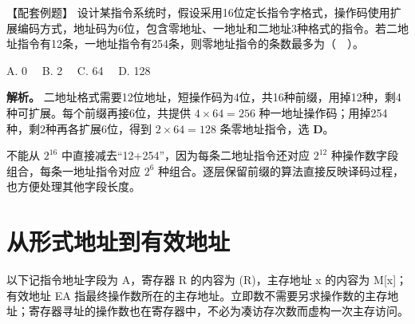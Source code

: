 \begin{example}[配套例题]

【配套例题】 设计某指令系统时，假设采用16位定长指令字格式，操作码使用扩展编码方式，地址码为6位，包含零地址、一地址和二地址3种格式的指令。若二地址指令有12条，一地址指令有254条，则零地址指令的条数最多为（　）。

A. 0　 B. 2　 C. 64　 D. 128

\end{example}

\textbf{解析。} 二地址格式需要12位地址，短操作码为4位，共16种前缀，用掉12种，剩4种可扩展。每个前缀再接6位，共提供 \(4\times64=256\) 种一地址操作码；用掉254种，剩2种再各扩展6位，得到 \(2\times64=128\) 条零地址指令，选 \textbf{D}。

不能从 \(2^{16}\) 中直接减去``12+254''，因为每条二地址指令还对应 \(2^{12}\) 种操作数字段组合，每条一地址指令对应 \(2^6\) 种组合。逐层保留前缀的算法直接反映译码过程，也方便处理其他字段长度。

\section{从形式地址到有效地址}\label{CO04-04}

以下记指令地址字段为 A，寄存器 R 的内容为 (R)，主存地址 x 的内容为 M{[}x{]}；有效地址 EA 指最终操作数所在的主存地址。立即数不需要另求操作数的主存地址；寄存器寻址的操作数也在寄存器中，不必为凑访存次数而虚构一次主存访问。


